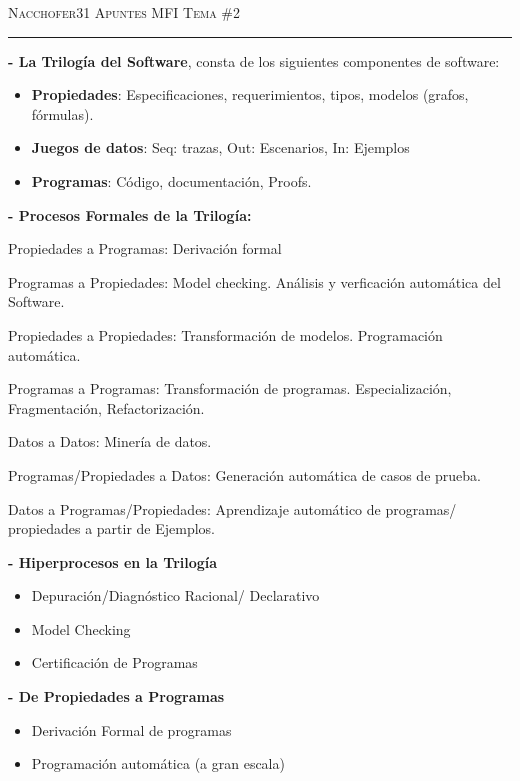 \documentclass[12pt]{amsart}
\begin{document}
    {\scshape Nacchofer31} \hfill {\scshape \large Apuntes MFI} \hfill {\scshape Tema \#2}
     
    \hrule
    \medskip
    
    \textbf{- La Trilogía del Software}, consta de los siguientes
    componentes de software:
    
    \begin{itemize}
        \item \textbf{Propiedades}: Especificaciones, requerimientos,
        tipos, modelos (grafos, fórmulas).
        \item \textbf{Juegos de datos}: Seq: trazas, Out: Escenarios,
        In: Ejemplos 
        \item \textbf{Programas}: Código, documentación, Proofs.
    \end{itemize}
    
    \textbf{- Procesos Formales de la Trilogía:}

    Propiedades a Programas: Derivación formal

    Programas a Propiedades: Model checking. Análisis y verficación automática
    del Software.

    Propiedades a Propiedades: Transformación de modelos. Programación
    automática.

    Programas a Programas: Transformación de programas. Especialización,
    Fragmentación, Refactorización.

    Datos a Datos: Minería de datos.

    Programas/Propiedades a Datos: Generación automática de casos de
    prueba.
    
    Datos a Programas/Propiedades: Aprendizaje automático de programas/
    propiedades a partir de Ejemplos.

    \textbf{- Hiperprocesos en la Trilogía}

    \begin{itemize}
        \item Depuración/Diagnóstico Racional/
        Declarativo
        \item Model Checking 
        \item Certificación de Programas
    \end{itemize}

    \textbf{- De Propiedades a Programas}

    \begin{itemize}
        \item \textrightarrow Derivación Formal de programas
        \item \textrightarrow Programación automática (a
        gran escala)
    \end{itemize}
\end{document}
